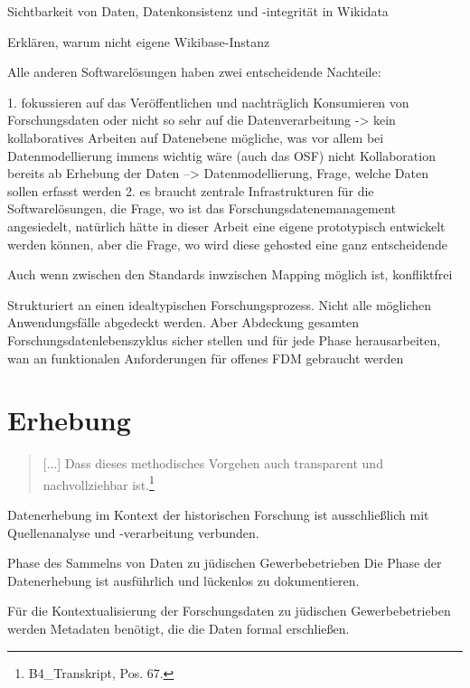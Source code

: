 Sichtbarkeit von Daten, Datenkonsistenz und -integrität in Wikidata

Erklären, warum nicht eigene Wikibase-Instanz

Alle anderen Softwarelösungen haben zwei entscheidende Nachteile:

1. fokussieren auf das Veröffentlichen und nachträglich Konsumieren von Forschungsdaten oder nicht so sehr auf die Datenverarbeitung -> kein kollaboratives Arbeiten auf Datenebene mögliche, was vor allem bei Datenmodellierung immens wichtig wäre (auch das OSF) nicht
Kollaboration bereits ab Erhebung der Daten --> Datenmodellierung, Frage, welche Daten sollen erfasst werden
2. es braucht zentrale Infrastrukturen für die Softwarelösungen, die Frage, wo ist das Forschungsdatenemanagement angesiedelt, natürlich hätte in dieser Arbeit eine eigene prototypisch entwickelt werden können, aber die Frage, wo wird diese gehosted eine ganz entscheidende

Auch wenn zwischen den Standards inwzischen Mapping möglich ist, konfliktfrei

Strukturiert an einen idealtypischen Forschungsprozess. Nicht alle möglichen Anwendungsfälle abgedeckt werden. Aber Abdeckung gesamten Forschungsdatenlebenszyklus sicher stellen und für jede Phase herausarbeiten, wan an funktionalen Anforderungen für offenes FDM gebraucht werden
\section{Erhebung}

\begin{quote}
    [...] Dass dieses methodisches Vorgehen auch transparent und nachvollziehbar ist.\footnote{B4\_Transkript, Pos. 67.}
\end{quote}

Datenerhebung im Kontext der historischen Forschung ist ausschließlich mit Quellenanalyse und -verarbeitung verbunden. 

Phase des Sammelns von Daten zu jüdischen Gewerbebetrieben
Die Phase der Datenerhebung ist ausführlich und lückenlos zu dokumentieren.

Für die Kontextualisierung der Forschungsdaten zu jüdischen Gewerbebetrieben werden Metadaten benötigt, die die Daten formal erschließen. 


